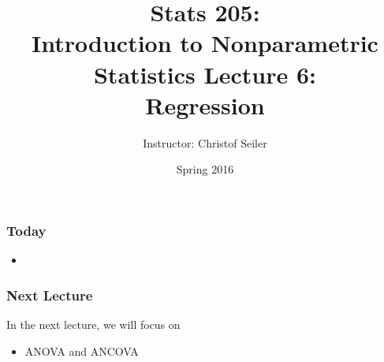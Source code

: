 \documentclass[10pt]{beamer}
\title{\large \bfseries Stats 205: \\ Introduction to Nonparametric Statistics \linebreak \linebreak \linebreak
Lecture 6: \\ Regression}
\author{Instructor: Christof Seiler}
\date{Spring 2016}
\begin{document}
\frame{
\thispagestyle{empty}
\titlepage
}

\begin{frame}
\frametitle{Today}

\begin{itemize}
\item 
\end{itemize}

\end{frame}

\begin{frame}
\frametitle{Next Lecture}

In the next lecture, we will focus on
\begin{itemize}
\item ANOVA and ANCOVA
\end{itemize}

\end{frame}
\end{document}

